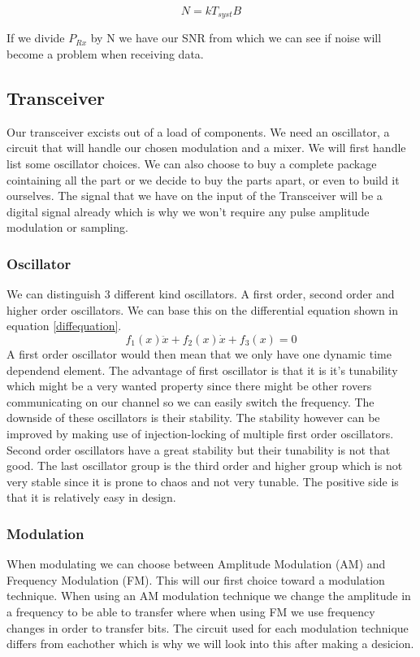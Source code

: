 \documentclass[10pt,a4paper]{article}
\begin{document}
\begin{equation}
\label{totalnoise}
N=kT_{syst}B
\end{equation}

If we divide $P_{Rx}$ by N we have our SNR from which we can see if noise will become a problem when receiving data.

\subsection{Transceiver}
Our transceiver excists out of a load of components. We need an oscillator, a circuit that will handle our chosen modulation and a mixer. We will first handle list some oscillator choices. We can also choose to buy a complete package cointaining all the part or we decide to buy the parts apart, or even to build it ourselves. The signal that we have on the input of the Transceiver will be a digital signal already which is why we won't require any pulse amplitude modulation or sampling.
\subsubsection{Oscillator}
We can distinguish 3 different kind oscillators. A first order, second order and higher order oscillators. We can base this on the differential equation shown in equation \ref{diffequation}.
\begin{equation}
\label{diffequation}
f_1(x)\ddot{x} + f_2(x)\dot{x} + f_3(x) = 0
\end{equation}
A first order oscillator would then mean that we only have one dynamic time dependend element. The advantage of first oscillator is that it is it's tunability which might be a very wanted property since there might be other rovers communicating on our channel so we can easily switch the frequency. The downside of these oscillators is their stability. The stability however can be improved by making use of injection-locking of multiple first order oscillators. Second order oscillators have a great stability but their tunability is not that good. The last oscillator group is the third order and higher group which is not very stable since it is prone to chaos and not very tunable. The positive side is that it is relatively easy in design.

\subsubsection{Modulation}
When modulating we can choose between Amplitude Modulation (AM) and Frequency Modulation (FM). This will our first choice toward a modulation technique. When using an AM modulation technique we change the amplitude in a frequency to be able to transfer where when using FM we use frequency changes in order to transfer bits. The circuit used for each modulation technique differs from eachother which is why we will look into this after making a desicion. 
\end{document}

